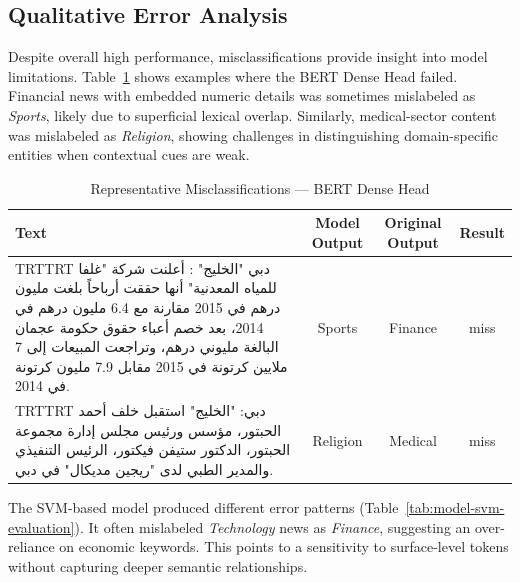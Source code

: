 \documentclass[preprint,12pt,authoryear]{elsarticle}
\newcommand{\RTL}[1]{%
  \bgroup
  \arabicfont
  \textdir TRT\pardir TRT
  #1%
  \egroup
}
\begin{document}
\subsection{Qualitative Error Analysis}

Despite overall high performance, misclassifications provide insight into model limitations. Table~\ref{tab:model-evaluation} shows examples where the BERT Dense Head failed. Financial news with embedded numeric details was sometimes mislabeled as \textit{Sports}, likely due to superficial lexical overlap. Similarly, medical-sector content was mislabeled as \textit{Religion}, showing challenges in distinguishing domain-specific entities when contextual cues are weak.

\begin{table}[h!]
    \centering
    \caption{Representative Misclassifications — BERT Dense Head}
    \label{tab:model-evaluation}
    \begin{tabularx}{\textwidth}{>{\raggedleft\arraybackslash}X c c c}
        \toprule
        \textbf{Text} & \textbf{Model Output} & \textbf{Original Output} & \textbf{Result} \\
        \midrule
        \RTL{دبي "الخليج" : أعلنت شركة "غلفا للمياه المعدنية" أنها حققت أرباحاً بلغت مليون درهم في 2015 مقارنة مع 6.4 مليون درهم في 2014، بعد خصم أعباء حقوق حكومة عجمان البالغة مليوني درهم، وتراجعت المبيعات إلى 7 ملايين كرتونة في 2015 مقابل 7.9 مليون كرتونة في 2014.} &
        Sports & Finance & miss \\
        \addlinespace
        \RTL{دبي: "الخليج" استقبل خلف أحمد الحبتور، مؤسس ورئيس مجلس إدارة مجموعة الحبتور، الدكتور ستيفن فيكتور، الرئيس التنفيذي والمدير الطبي لدى "ريجين مديكال" في دبي.} &
        Religion & Medical & miss \\
        \bottomrule
    \end{tabularx}
\end{table}

The SVM-based model produced different error patterns (Table~\ref{tab:model-svm-evaluation}). It often mislabeled \textit{Technology} news as \textit{Finance}, suggesting an over-reliance on economic keywords. This points to a sensitivity to surface-level tokens without capturing deeper semantic relationships.
\end{document}
